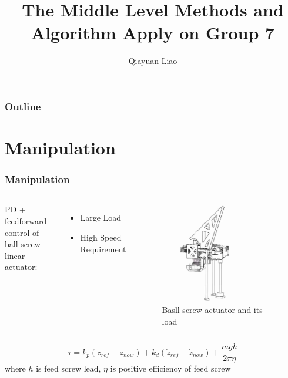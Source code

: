 \documentclass{beamer}
\title{The Middle Level Methods and Algorithm Apply on Group 7}
\author{Qiayuan Liao\inst{1}}
\date{}
\institute[] %
{
  \inst{1}
  liaoqiayuan@gmail.com
}
\begin{document}
\begin{frame}
  \titlepage
\end{frame}

\begin{frame}
  \frametitle{Outline}
  \tableofcontents
\end{frame}

\section{Manipulation}

\begin{frame}
  \frametitle{Manipulation}
  \vspace{-2.0cm}
  \begin{columns}
    PD + feedforward control of ball screw linear actuator:
    \begin{itemize}
      \item Large Load
      \item High Speed Requirement
    \end{itemize}

    \begin{figure}
      \includegraphics[width = 0.8\textwidth]{fig/screw.jpg}
      \caption{Basll screw actuator and its load}
    \end{figure}
  \end{columns}
  \begin{equation}
    \tau = k_p(z_{ref}-z_{now})+k_d(\dot{z}_{ref}-\dot{z}_{now})+ \frac{mgh}{2\pi \eta}
  \end{equation}
  where $h$ is feed screw lead, $\eta$ is positive efficiency of feed screw
\end{frame}
\end{document}
